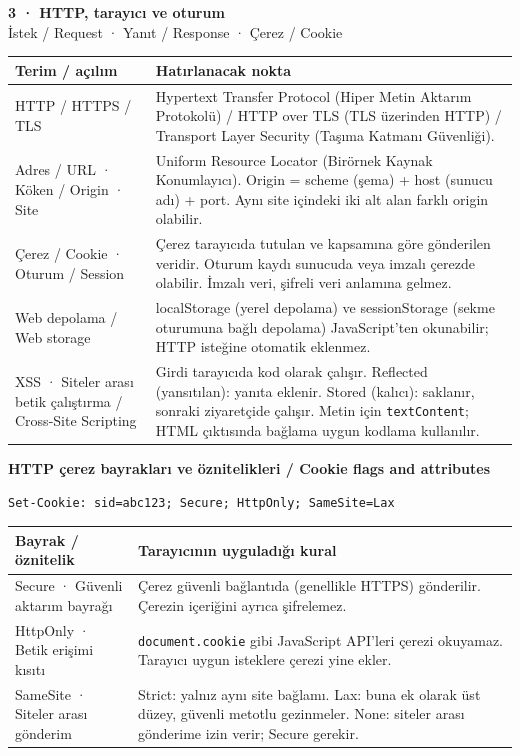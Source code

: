 \documentclass[11pt,a4paper]{article}
\newcommand{\AltBaslik}[1]{\par\vspace{3pt}\textbf{#1}\par\nobreak}
\begin{document}
\newpage
{\Large\bfseries 3 · HTTP, tarayıcı ve oturum}\\[3pt]
{\normalsize İstek / Request · Yanıt / Response · Çerez / Cookie}\\[5pt]
\begingroup\small\begin{tabularx}{\linewidth}{@{}LY@{}}\toprule
Terim / açılım & Hatırlanacak nokta\\\midrule
HTTP / HTTPS / TLS & Hypertext Transfer Protocol (Hiper Metin Aktarım Protokolü) / HTTP over TLS (TLS üzerinden HTTP) / Transport Layer Security (Taşıma Katmanı Güvenliği).\\[2pt]
Adres / URL · Köken / Origin · Site & Uniform Resource Locator (Birörnek Kaynak Konumlayıcı). Origin = scheme (şema) + host (sunucu adı) + port. Aynı site içindeki iki alt alan farklı origin olabilir.\\[2pt]
Çerez / Cookie · Oturum / Session & Çerez tarayıcıda tutulan ve kapsamına göre gönderilen veridir. Oturum kaydı sunucuda veya imzalı çerezde olabilir. İmzalı veri, şifreli veri anlamına gelmez.\\[2pt]
Web depolama / Web storage & localStorage (yerel depolama) ve sessionStorage (sekme oturumuna bağlı depolama) JavaScript’ten okunabilir; HTTP isteğine otomatik eklenmez.\\[2pt]
XSS · Siteler arası betik çalıştırma / Cross-Site Scripting & Girdi tarayıcıda kod olarak çalışır. Reflected (yansıtılan): yanıta eklenir. Stored (kalıcı): saklanır, sonraki ziyaretçide çalışır. Metin için \texttt{textContent}; HTML çıktısında bağlama uygun kodlama kullanılır.\\[2pt]
\bottomrule\end{tabularx}\endgroup\par
\AltBaslik{HTTP çerez bayrakları ve öznitelikleri / Cookie flags and attributes}
\begin{Verbatim}[fontsize=\footnotesize,breaklines=true,breakanywhere=true,frame=lines,framesep=3mm]
Set-Cookie: sid=abc123; Secure; HttpOnly; SameSite=Lax
\end{Verbatim}
\begingroup\small\begin{tabularx}{\linewidth}{@{}LY@{}}\toprule
Bayrak / öznitelik & Tarayıcının uyguladığı kural\\\midrule
Secure · Güvenli aktarım bayrağı & Çerez güvenli bağlantıda (genellikle HTTPS) gönderilir. Çerezin içeriğini ayrıca şifrelemez.\\[2pt]
HttpOnly · Betik erişimi kısıtı & \texttt{document.cookie} gibi JavaScript API’leri çerezi okuyamaz. Tarayıcı uygun isteklere çerezi yine ekler.\\[2pt]
SameSite · Siteler arası gönderim & Strict: yalnız aynı site bağlamı. Lax: buna ek olarak üst düzey, güvenli metotlu gezinmeler. None: siteler arası gönderime izin verir; Secure gerekir.\\[2pt]
\bottomrule\end{tabularx}\endgroup\par
\end{document}
